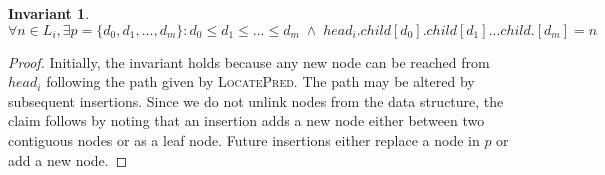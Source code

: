 \documentclass[10pt,journal,letterpaper,compsoc]{IEEEtran}
\newtheorem{lemma}{Lemma}
\newtheorem{invariant}{Invariant}
\begin{document}
\begin{invariant} \label{inv:reachability}
    $\forall n \in L_i, \exists p=\{d_0,d_1,...,d_m\} : d_0\le d_1 \le ... \le d_m\;\land\;head_i.child[d_0].child[d_1]...child.[d_m]=n$
\end{invariant}
\begin{proof}
    Initially, the invariant holds because any new node can be reached from $head_i$ following the path given by \textsc{LocatePred}.
    The path may be altered by subsequent insertions. 
    Since we do not unlink nodes from the data structure, the claim follows by noting that an insertion adds a new node either between two contiguous nodes or as a leaf node. 
Future insertions either replace a node in $p$ or add a new node.
\end{proof}



\end{document}
